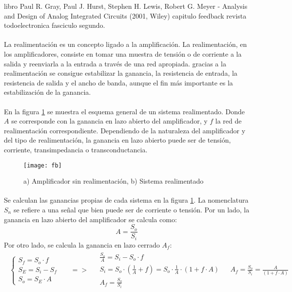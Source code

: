 libro Paul R. Gray, Paul J. Hurst, Stephen H. Lewis, Robert G. Meyer - Analysis and Design of Analog Integrated Circuits (2001, Wiley) capitulo feedback revista todoelectronica fasciculo segundo.
\paragraph{}
La realimentación es un concepto ligado a la amplificación.
La realimentación, en los amplificadores, consiste en tomar una muestra de tensión o de corriente a la salida y reenviarla a la entrada a través de una red apropiada.
gracias a la realimentación se consigue estabilizar la ganancia, la resistencia de entrada, la resistencia de salida y el ancho de banda, aunque el fin más importante es la estabilización de la ganancia.
\paragraph{}
En la figura \ref{fig:fb} se muestra el esquema general de un sistema realimentado. Donde $A$ se corresponde con la ganancia en lazo abierto del amplificador, y $f$ la red de realimentaci\'on correspondiente. Dependiendo de la naturaleza del amplificador y del tipo de realimentación, la ganancia en lazo abierto puede ser de tensión, corriente, transimpedancia o transconductancia.
\begin{figure}[h]
    \centering
    \texttt{[image: fb]}
    \caption{a) Amplificador sin realimentaci\'on, b) Sistema realimentado} 
    \label{fig:fb}
\end{figure}
\paragraph{}
Se calculan las ganancias propias de cada sistema en la figura \ref{fig:fb}. La nomenclatura $S_n$ se refiere a una señal que bien puede ser de corriente o tensión.
Por un lado, la ganancia en lazo abierto del amplificador se calcula como:
$$A = \frac{S_o}{S_i} $$
Por otro lado, se calcula la ganancia en lazo cerrado $A_f$:
\[
\begin{array}{rccl} 
      \begin{array}{l}
	 \begin{cases}
	    S_f = S_o \cdot f \\
	    S_E = S_i - S_f \\
	    S_o = S_E \cdot A
	 \end{cases}
      \end{array}
      &
      \begin{array}{l}
	  =>
      \end{array}
      &
      \begin{array}{l}
	 \frac{S_o}{A} = S_i - S_o \cdot f \\
	 S_i = S_o \cdot \left(\frac{1}{A} + f \right) = S_o \cdot \frac{1}{A} \cdot (1 + f \cdot A) \\
	 A_f = \frac{S_o}{S_i}
      \end{array}
      &
      \begin{array}{l}
	 A_f = \frac{S_o}{S_i} = \frac{A}{(1 + f \cdot A)} 
      \end{array}
\end{array}
\]
